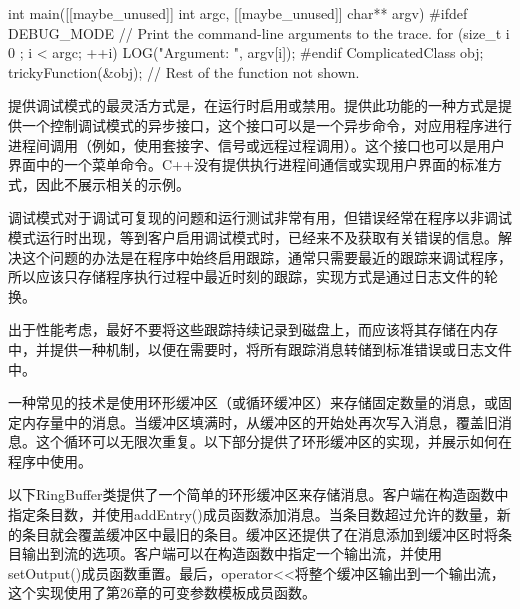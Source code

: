 \begin{cpp}
int main([[maybe_unused]] int argc, [[maybe_unused]] char** argv)
{
#ifdef DEBUG_MODE
    // Print the command-line arguments to the trace.
    for (size_t i { 0 }; i < argc; ++i) { LOG("Argument: ", argv[i]); }
#endif
    ComplicatedClass obj;
    trickyFunction(&obj);
    // Rest of the function not shown.
}
\end{cpp}


提供调试模式的最灵活方式是，在运行时启用或禁用。提供此功能的一种方式是提供一个控制调试模式的异步接口，这个接口可以是一个异步命令，对应用程序进行进程间调用（例如，使用套接字、信号或远程过程调用）。这个接口也可以是用户界面中的一个菜单命令。C++没有提供执行进程间通信或实现用户界面的标准方式，因此不展示相关的示例。


调试模式对于调试可复现的问题和运行测试非常有用，但错误经常在程序以非调试模式运行时出现，等到客户启用调试模式时，已经来不及获取有关错误的信息。解决这个问题的办法是在程序中始终启用跟踪，通常只需要最近的跟踪来调试程序，所以应该只存储程序执行过程中最近时刻的跟踪，实现方式是通过日志文件的轮换。

出于性能考虑，最好不要将这些跟踪持续记录到磁盘上，而应该将其存储在内存中，并提供一种机制，以便在需要时，将所有跟踪消息转储到标准错误或日志文件中。

一种常见的技术是使用环形缓冲区（或循环缓冲区）来存储固定数量的消息，或固定内存量中的消息。当缓冲区填满时，从缓冲区的开始处再次写入消息，覆盖旧消息。这个循环可以无限次重复。以下部分提供了环形缓冲区的实现，并展示如何在程序中使用。


以下RingBuffer类提供了一个简单的环形缓冲区来存储消息。客户端在构造函数中指定条目数，并使用addEntry()成员函数添加消息。当条目数超过允许的数量，新的条目就会覆盖缓冲区中最旧的条目。缓冲区还提供了在消息添加到缓冲区时将条目输出到流的选项。客户端可以在构造函数中指定一个输出流，并使用setOutput()成员函数重置。最后，operator<{}<将整个缓冲区输出到一个输出流，这个实现使用了第26章的可变参数模板成员函数。

